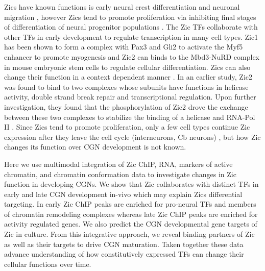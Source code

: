 \documentclass[fleqn,10pt]{wlscirep}
\begin{document}
Zics have known functions is early neural crest differentiation \cite{Aruga2004TheDevelopment} and neuronal migration \cite{Murillo2015Zic2Forebrain, Zhong2012ZIC1Cancer}, however Zics tend to promote proliferation via inhibiting final stages of differentiation of neural progenitor populations  \cite{Blank2011MultiplePathogenesis, Aruga2010ExpressionTumors, Nyholm2007TheTectum, Watabe2011TheCells}. The Zic TFs collaborate with other TFs in early development to regulate transcription in many cell types. Zic1 has been shown to form a complex with Pax3 and Gli2 to activate the Myf5 enhancer to promote myogenesis \cite{Himeda2013Pax3Enhancer} and Zic2 can binds to the Mbd3-NuRD complex in mouse embryonic stem cells to regulate cellular differentiation\cite{Luo2015Zic2Specification}. Zics can also change their function in a context dependent manner \cite{Ishiguro2007ZIC2-dependentA, Himeda2013Pax3Enhancer, Luo2015Zic2Specification, Hatayama2018RoleRemodeling.}. In an earlier study, Zic2 was found to bind to two complexes whose subunits have functions in helicase activity, double strand break repair and transcriptional regulation. Upon further investigation, they found that the phosphorylation of Zic2 drove the exchange between these two complexes to stabilize the binding of a helicase and RNA-Pol II \cite{Ishiguro2007ZIC2-dependentA}. Since Zics tend to promote proliferation, only a few cell types continue Zic expression after they leave the cell cycle (interneurons, Cb neurons) \cite{Frank2015RegulationCerebellum}, but how Zic changes its function over CGN development is not known.

Here we use multimodal integration of Zic ChIP, RNA, markers of active chromatin, and chromatin conformation data to investigate changes in Zic function in developing CGNs. We show that Zic collaborates with distinct TFs in early and late CGN development in-vivo which may explain Zics differential targeting. In early Zic ChIP peaks are enriched for pro-neural TFs and members of chromatin remodeling complexes whereas late Zic ChIP peaks are enriched for activity regulated genes. We also predict the CGN developmental gene targets of Zic in culture. From this integrative approach, we reveal binding partners of Zic as well as their targets to drive CGN maturation. Taken together these data advance understanding of how constitutively expressed TFs can change their cellular functions over time. 
\end{document}
